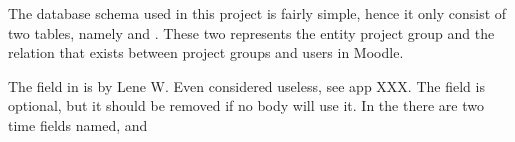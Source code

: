 




The database schema used in this project is fairly simple, hence it only consist of two tables, namely   and . 
These two represents the entity project group and the relation that exists between project groups and users in Moodle. 

The  field in  is by Lene W. Even considered useless, see app XXX. 
The field is optional, but it should be removed if no body will use it. 
In the  there are two time fields named,  and 









